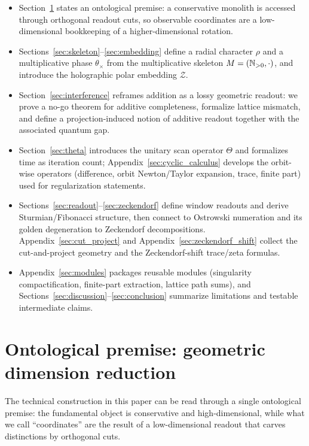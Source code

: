 \begin{itemize}
    \item Section~\ref{sec:ontological_premise} states an ontological premise: a conservative monolith is accessed through orthogonal readout cuts, so observable coordinates are a low-dimensional bookkeeping of a higher-dimensional rotation.
    \item Sections~\ref{sec:skeleton}--\ref{sec:embedding} define a radial character $\rho$ and a multiplicative phase $\theta_\times$ from the multiplicative skeleton $M=(\mathbb{N}_{>0},\cdot)$, and introduce the holographic polar embedding $\mathcal{Z}$.
    \item Section~\ref{sec:interference} reframes addition as a lossy geometric readout: we prove a no-go theorem for additive completeness, formalize lattice mismatch, and define a projection-induced notion of additive readout together with the associated quantum gap.
    \item Section~\ref{sec:theta} introduces the unitary scan operator $\Theta$ and formalizes time as iteration count; Appendix~\ref{sec:cyclic_calculus} develops the orbit-wise operators (difference, orbit Newton/Taylor expansion, trace, finite part) used for regularization statements.
    \item Sections~\ref{sec:readout}--\ref{sec:zeckendorf} define window readouts and derive Sturmian/Fibonacci structure, then connect to Ostrowski numeration and its golden degeneration to Zeckendorf decompositions. Appendix~\ref{sec:cut_project} and Appendix~\ref{sec:zeckendorf_shift} collect the cut-and-project geometry and the Zeckendorf-shift trace/zeta formulas.
    \item Appendix~\ref{sec:modules} packages reusable modules (singularity compactification, finite-part extraction, lattice path sums), and Sections~\ref{sec:discussion}--\ref{sec:conclusion} summarize limitations and testable intermediate claims.
\end{itemize}

\section{Ontological premise: geometric dimension reduction}
\label{sec:ontological_premise}
The technical construction in this paper can be read through a single ontological premise: the fundamental object is conservative and high-dimensional, while what we call ``coordinates'' are the result of a low-dimensional readout that carves distinctions by orthogonal cuts.

